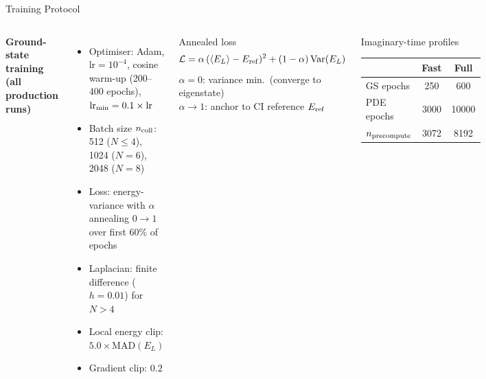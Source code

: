 \documentclass[aspectratio=169,10pt]{beamer}
\begin{document}
\begin{frame}{Training Protocol}
  \begin{columns}[T]
      \textbf{Ground-state training (all production runs)}
      \begin{itemize}
        \item Optimiser: Adam, $\text{lr}=10^{-4}$, cosine warm-up
              (200--400 epochs), $\text{lr}_{\rm min}=0.1\times\text{lr}$
        \item Batch size $n_{\rm coll}$: 512 ($N\leq4$), 1024 ($N=6$),
              2048 ($N=8$)
        \item Loss: energy-variance with $\alpha$ annealing $0\to1$
              over first 60\% of epochs
        \item Laplacian: finite difference ($h=0.01$) for $N>4$
        \item Local energy clip: $5.0\times\mathrm{MAD}(E_L)$
        \item Gradient clip: $0.2$
      \end{itemize}
      \begin{block}{Annealed loss}
        \[
          \mathcal{L} = \alpha\,(\langle E_L\rangle - E_{\rm ref})^2
          + (1-\alpha)\,\mathrm{Var}(E_L)
        \]
        $\alpha=0$: variance min.\ (converge to eigenstate)\\
        $\alpha\to1$: anchor to CI reference $E_{\rm ref}$
      \end{block}
      \vspace{0.2cm}
      \begin{block}{Imaginary-time profiles}
        \renewcommand{\arraystretch}{1.2}
        \scriptsize
        \begin{tabular}{l|cc}
          \toprule
          & Fast & Full \\
          \midrule
          GS epochs   & 250  & 600   \\
          PDE epochs  & 3000 & 10000 \\
          $n_{\rm precompute}$ & 3072 & 8192 \\
          \bottomrule
        \end{tabular}
        \normalsize
      \end{block}
  \end{columns}
\end{frame}
\end{document}
